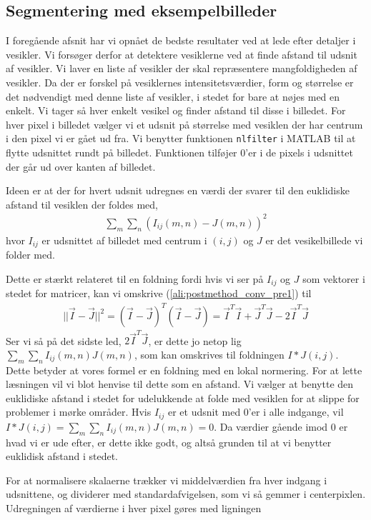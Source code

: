 \subsection{Segmentering med eksempelbilleder}
I foregående afsnit har vi opnået de bedste resultater ved at lede efter detaljer i vesikler. Vi forsøger derfor at detektere vesiklerne ved at finde afstand til udsnit af vesikler. Vi laver en liste af vesikler der skal repræsentere mangfoldigheden af vesikler. Da der er forskel på vesiklernes intensitetsværdier, form og størrelse er det nødvendigt med denne liste af vesikler, i stedet for bare at nøjes med en enkelt. Vi tager så hver enkelt vesikel og finder afstand til disse i billedet. For hver pixel i billedet vælger vi et udsnit på størrelse med vesiklen der har centrum i den pixel vi er gået ud fra. Vi benytter funktionen \texttt{nlfilter} i MATLAB til at flytte udsnittet rundt på billedet. Funktionen tilføjer 0'er i de pixels i udsnittet der går ud over kanten af billedet.

Ideen er at der for hvert udsnit udregnes en værdi der svarer til den euklidiske afstand til vesiklen der foldes med,
\begin{align}
	\sum_m\sum_n\left(I_{ij}(m,n)-J(m,n)\right)^2\label{ali:postmethod_conv_pre1}
\end{align}
hvor $I_{ij}$ er udsnittet af billedet med centrum i $(i,j)$ og $J$ er det vesikelbillede vi folder med. 

Dette er stærkt relateret til en foldning fordi hvis vi ser på $I_{ij}$ og $J$ som vektorer i stedet for matricer, kan vi omskrive (\ref{ali:postmethod_conv_pre1}) til
\begin{align}
	||\vec{I}-\vec{J}||^2 = (\vec{I}-\vec{J})^T(\vec{I}-\vec{J}) = \vec{I}^T\vec{I} + \vec{J}^T\vec{J}-2\vec{I}^T\vec{J}
\end{align}
Ser vi så på det sidste led, $2\vec{I}^T\vec{J}$, er dette jo netop lig $\sum_m\sum_nI_{ij}(m,n)J(m,n)$, som kan omskrives til foldningen $I*J(i,j)$. Dette betyder at vores formel er en foldning med en lokal normering. For at lette læsningen vil vi blot henvise til dette som en afstand. Vi vælger at benytte den euklidiske afstand i stedet for udelukkende at folde med vesiklen for at slippe for problemer i mørke områder. Hvis $I_{ij}$ er et udsnit med 0'er i alle indgange, vil $I*J(i,j)=\sum_m\sum_nI_{ij}(m,n)J(m,n)=0$. Da værdier gående imod 0 er hvad vi er ude efter, er dette ikke godt, og altså grunden til at vi benytter euklidisk afstand i stedet.

For at normalisere skalaerne trækker vi middelværdien fra hver indgang i udsnittene, og dividerer med standardafvigelsen, som vi så gemmer i centerpixlen. Udregningen af værdierne i hver pixel gøres med ligningen

